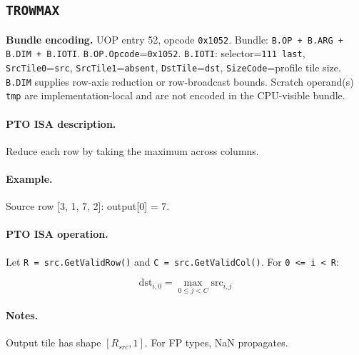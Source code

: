 \subsection{\texttt{TROWMAX}}
\noindent\textbf{Bundle encoding.} UOP entry 52, opcode \texttt{0x1052}. Bundle: \texttt{B.OP + B.ARG + B.DIM + B.IOTI}. \texttt{B.OP.Opcode}=\texttt{0x1052}. \texttt{B.IOTI}: selector=\texttt{111 last}, \texttt{SrcTile0}=\texttt{src}, \texttt{SrcTile1}=\texttt{absent}, \texttt{DstTile}=\texttt{dst}, \texttt{SizeCode}=profile tile size. \texttt{B.DIM} supplies row-axis reduction or row-broadcast bounds. Scratch operand(s) \texttt{tmp} are implementation-local and are not encoded in the CPU-visible bundle.\par\smallskip
{\small
\paragraph{PTO ISA description.}
Reduce each row by taking the maximum across columns.
\paragraph{Example.}
Source row [3, 1, 7, 2]: output[0] = 7.
\par\smallskip
\paragraph{PTO ISA operation.}
Let \texttt{R = src.GetValidRow()} and \texttt{C = src.GetValidCol()}. For \texttt{0 \textless{}= i \textless{} R}:

\[
\mathrm{dst}_{i,0} = \max_{0 \le j < C} \mathrm{src}_{i,j}
\]
}\par\smallskip
\paragraph{Notes.}
Output tile has shape $[R_{src}, 1]$. For FP types, NaN propagates.
